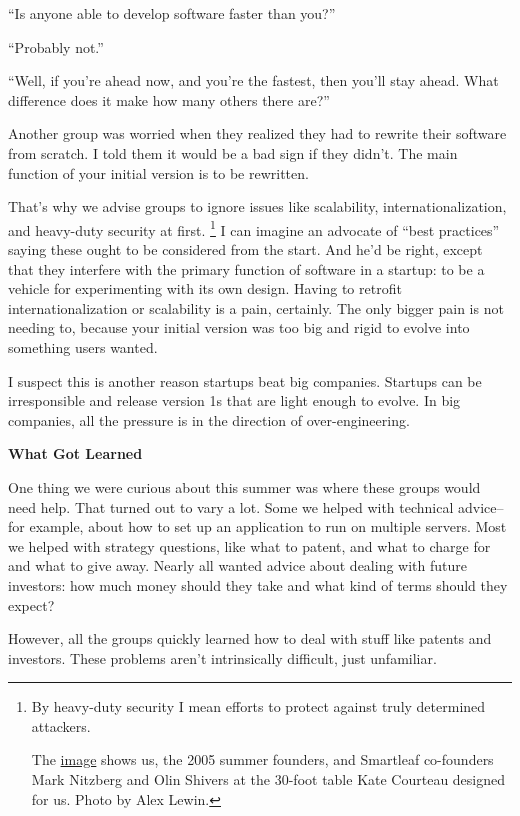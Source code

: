 \documentclass[12pt]{book}
\begin{document}
``Is anyone able to develop software faster than you?''

``Probably not.''

``Well, if you're ahead now, and you're the fastest, then you'll stay
ahead. What difference does it make how many others there are?''

Another group was worried when they realized they had to rewrite their
software from scratch. I told them it would be a bad sign if they
didn't. The main function of your initial version is to be rewritten.

That's why we advise groups to ignore issues like scalability,
internationalization, and heavy-duty security at first. \footnote{By heavy-duty security I mean efforts to protect against truly
determined attackers.

The
\href{https://sep.turbifycdn.com/ty/cdn/paulgraham/sfptable.jpg?t=1688221954&}{image}
shows us, the 2005 summer founders, and Smartleaf co-founders Mark
Nitzberg and Olin Shivers at the 30-foot table Kate Courteau designed
for us. Photo by Alex Lewin.} I can
imagine an advocate of ``best practices'' saying these ought to be
considered from the start. And he'd be right, except that they interfere
with the primary function of software in a startup: to be a vehicle for
experimenting with its own design. Having to retrofit
internationalization or scalability is a pain, certainly. The only
bigger pain is not needing to, because your initial version was too big
and rigid to evolve into something users wanted.

I suspect this is another reason startups beat big companies. Startups
can be irresponsible and release version 1s that are light enough to
evolve. In big companies, all the pressure is in the direction of
over-engineering.

\textbf{What Got Learned}

One thing we were curious about this summer was where these groups would
need help. That turned out to vary a lot. Some we helped with technical
advice-- for example, about how to set up an application to run on
multiple servers. Most we helped with strategy questions, like what to
patent, and what to charge for and what to give away. Nearly all wanted
advice about dealing with future investors: how much money should they
take and what kind of terms should they expect?

However, all the groups quickly learned how to deal with stuff like
patents and investors. These problems aren't intrinsically difficult,
just unfamiliar.
\end{document}
